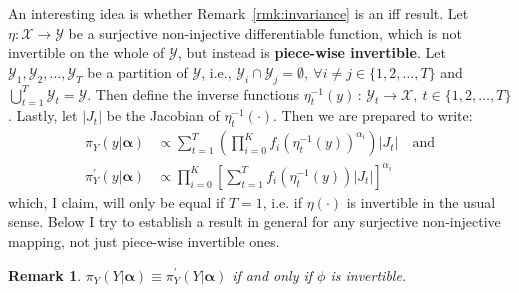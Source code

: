 \documentclass[a4paper, notitlepage, 10pt]{article}
\newtheorem{remark}{Remark}[]
\begin{document}
An interesting idea is whether Remark~\ref{rmk:invariance} is an iff result. 
Let $\eta : \mathcal{X} \to \mathcal{Y}$ be a surjective non-injective differentiable function, which is not invertible on the whole of $\mathcal{Y}$, but instead is \textbf{piece-wise invertible}.
Let $\mathcal{Y}_1, \mathcal{Y}_2, \ldots, \mathcal{Y}_T$ be a  partition of $\mathcal{Y}$, i.e., $\mathcal{Y}_i\cap\mathcal{Y}_j = \emptyset,\: \forall i\neq j \in \{1, 2, \ldots, T\}$ and $\bigcup_{t = 1}^T\mathcal{Y}_t = \mathcal{Y}$.
Then define the inverse functions $\eta_{t}^{-1}(y)\,:\, \mathcal{Y}_t \to \mathcal{X}, \: t \in \{1, 2, \ldots, T\}$.
Lastly, let $|J_t|$ be the Jacobian of $\eta_{t}^{-1}(\cdot)$.
Then we are prepared to write:
\begin{align}
\label{eq:piecewiseTransf}
\pi_{Y}(y |\boldsymbol\alpha) &\propto \sum_{t = 1}^T\left(\prod_{i=0}^K f_i(\eta_t^{-1}(y))^{\alpha_i}\right)|J_t| \quad \text{and}\\
\pi^{\prime}_{Y}(y|\boldsymbol\alpha) &\propto \prod_{i=0}^K\left[\sum_{t = 1}^T f_i(\eta_t^{-1}(y))|J_t|\right]^{\alpha_i}
\end{align}
which, I claim, will only be equal if $T = 1$, i.e. if $\eta(\cdot)$ is invertible in the usual sense.
Below I try to establish a result in general for any surjective non-injective mapping, not just piece-wise invertible ones.
\begin{remark}
 \label{rmk:invertibleIFF}
 $\pi_Y(Y | \boldsymbol \alpha) \equiv \pi_Y^{\prime}(Y|  \boldsymbol \alpha)$ if and only if $\phi$ is invertible.
\end{remark}
\end{document}
